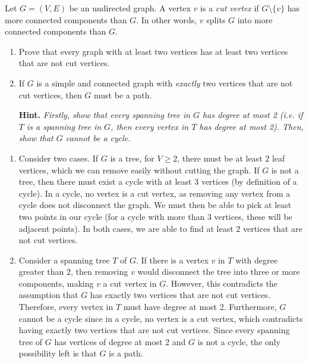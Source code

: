 \documentclass{article}
\begin{document}
\begin{question}
Let $G = (V, E)$ be an undirected graph. A vertex $v$ is a {\em cut vertex} if $G \setminus \{v\}$ has more connected components than $G$. In other words, $v$ splits $G$ into more connected components than $G$.

\begin{enumerate}[label = (\alph*)]
    \item Prove that every graph with at least two vertices has at least two vertices that are not cut vertices.

    \item If $G$ is a simple and connected graph with {\em exactly} two vertices that are not cut vertices, then $G$ must be a path.

    {\bfseries Hint.} {\em Firstly, show that every spanning tree in $G$ has degree at most 2 (i.e. if $T$ is a spanning tree in $G$, then every vertex in $T$ has degree at most 2). Then, show that $G$ cannot be a cycle.}
\end{enumerate}
\end{question}

\begin{solution}
\begin{enumerate}[label = (\alph*)]
    \item Consider two cases. If $G$ is a tree, for $V \geq 2$, there must be at least $2$ leaf vertices, which we can remove easily without cutting the graph. If $G$ is not a tree, then there must exist a cycle with at least $3$ vertices (by definition of a cycle). In a cycle, no vertex is a cut vertex, as removing any vertex from a cycle does not disconnect the graph. We must then be able to pick at least two points in our cycle (for a cycle with more than $3$ vertices, these will be adjacent points). In both cases, we are able to find at least $2$ vertices that are not cut vertices.

    \item Consider a spanning tree $T$ of $G$. If there is a vertex $v$ in $T$ with degree greater than $2$, then removing $v$ would disconnect the tree into three or more components, making $v$ a cut vertex in $G$. However, this contradicts the assumption that $G$ has exactly two vertices that are not cut vertices. Therefore, every vertex in $T$ must have degree at most 2. Furthermore, $G$ cannot be a cycle since in a cycle, no vertex is a cut vertex, which contradicts having exactly two vertices that are not cut vertices. Since every spanning tree of $G$ has vertices of degree at most 2 and $G$ is not a cycle, the only possibility left is that $G$ is a path.
\end{enumerate}
\end{solution}
\end{document}
